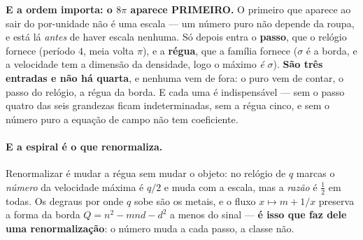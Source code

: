 \documentclass[livro.tex]{subfiles}
\begin{document}
\medskip
\noindent \textbf{E a ordem importa: o $8\pi$ aparece PRIMEIRO.} O primeiro que aparece ao sair do
por-unidade não é uma escala --- um número puro não depende da roupa, e está lá \emph{antes} de
haver escala nenhuma. Só depois entra o \textbf{passo}, que o relógio fornece (período $4$, meia
volta $\pi$), e a \textbf{régua}, que a família fornece ($\sigma$ é a borda, e a velocidade tem a
dimensão da densidade, logo o máximo \emph{é} $\sigma$). \textbf{São três entradas e não há
quarta}, e nenhuma vem de fora: o puro vem de contar, o passo do relógio, a régua da borda. E cada
uma é indispensável --- sem o passo quatro das seis grandezas ficam indeterminadas, sem a régua
cinco, e sem o número puro a equação de campo não tem coeficiente.


\paragraph{E a espiral é o que renormaliza.} Renormalizar é mudar a régua sem mudar o objeto: no
relógio de $q$ marcas o \emph{número} da velocidade máxima é $q/2$ e muda com a escala, mas a
\emph{razão} é $\tfrac12$ em todas. Os degraus por onde $q$ sobe são os metais, e o fluxo
$x\mapsto m+1/x$ preserva a forma da borda $Q=n^{2}-mnd-d^{2}$ a menos do sinal --- \textbf{é isso
que faz dele uma renormalização}: o número muda a cada passo, a classe não.

\end{document}
